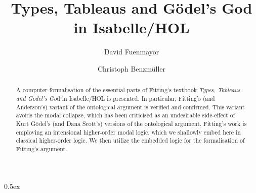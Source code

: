 \documentclass[11pt,a4paper]{article}
\begin{document}
\title{Types, Tableaus and G\"odel's God \\ in Isabelle/HOL}
\author[1]{David Fuenmayor}
\author[2,1]{Christoph Benzm\"uller}

\maketitle

\begin{abstract}
	A computer-formalisation of the essential parts of Fitting's textbook
	\emph{Types, Tableaus and G\"odel's Go}d in Isabelle/HOL is
	presented. In particular, Fitting's (and Anderson's) variant of the ontological
	argument is verified and confirmed. This variant avoids the modal
	collapse, which has been criticised as an undesirable side-effect of Kurt G\"odel's (and
	Dana Scott's) versions of the ontological argument. Fitting's work
	is employing an intensional higher-order modal logic, which we
	shallowly embed here in classical higher-order logic. We then
	utilize the embedded logic for the formalisation of Fitting's argument.
\end{abstract}

\tableofcontents

\parindent 0pt\parskip 0.5ex


\pagebreak 




\end{document}
